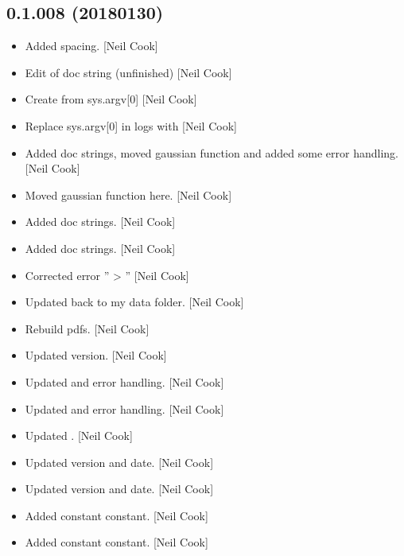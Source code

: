 \documentclass[a4paper,10pt,english]{report}
\begin{document}
\subsection{0.1.008 (2018\sphinxhyphen{}01\sphinxhyphen{}30)}
\label{\detokenize{misc/changelog:id515}}\begin{itemize}
\item {} 
Added spacing. {[}Neil Cook{]}

\item {} 
Edit of doc string (unfinished) {[}Neil Cook{]}

\item {} 
Create  from sys.argv{[}0{]} {[}Neil Cook{]}

\item {} 
Replace sys.argv{[}0{]} in logs with
 {[}Neil Cook{]}

\item {} 
Added doc strings, moved gaussian function and added some error
handling. {[}Neil Cook{]}

\item {} 
Moved gaussian function here. {[}Neil Cook{]}

\item {} 
Added doc strings. {[}Neil Cook{]}

\item {} 
Added doc strings. {[}Neil Cook{]}

\item {} 
Corrected error ” \textendash{}\textgreater{} ” {[}Neil Cook{]}

\item {} 
Updated back to my data folder. {[}Neil Cook{]}

\item {} 
Rebuild pdfs. {[}Neil Cook{]}

\item {} 
Updated version. {[}Neil Cook{]}

\item {} 
Updated  and error handling. {[}Neil Cook{]}

\item {} 
Updated  and error handling. {[}Neil Cook{]}

\item {} 
Updated . {[}Neil Cook{]}

\item {} 
Updated version and date. {[}Neil Cook{]}

\item {} 
Updated version and date. {[}Neil Cook{]}

\item {} 
Added  constant constant. {[}Neil Cook{]}

\item {} 
Added  constant constant. {[}Neil Cook{]}

\end{itemize}
\end{document}
